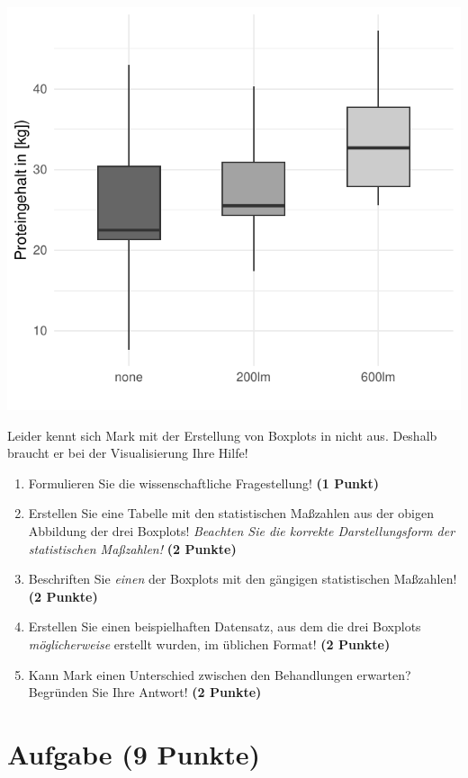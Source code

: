 \documentclass[a4paper, 9pt]{scrartcl}\usepackage[]{graphicx}\usepackage[]{xcolor}
\makeatletter
\def\maxwidth{ %
  \ifdim\Gin@nat@width>\linewidth
    \linewidth
  \else
    \Gin@nat@width
  \fi
}
\makeatother
\begin{document}
{\centering \includegraphics[width=\maxwidth]{img/boxplot-02-zer-1} 

}




Leider kennt sich Mark mit der Erstellung von Boxplots in \Rlogo nicht aus. Deshalb braucht er bei der Visualisierung Ihre Hilfe!

\begin{enumerate}
\item Formulieren Sie die wissenschaftliche Fragestellung! \textbf{(1 Punkt)}
\item Erstellen Sie eine Tabelle mit den statistischen Maßzahlen aus der obigen Abbildung der drei Boxplots! \textit{Beachten Sie die korrekte Darstellungsform der statistischen Maßzahlen!} \textbf{(2 Punkte)}
\item Beschriften Sie \textit{einen} der Boxplots mit den gängigen statistischen Maßzahlen! \textbf{(2 Punkte)}
\item Erstellen Sie einen beispielhaften Datensatz, aus dem die drei Boxplots \textit{möglicherweise} erstellt wurden, im \Rlogo üblichen Format! \textbf{(2 Punkte)}
\item Kann Mark einen Unterschied zwischen den Behandlungen erwarten? Begründen Sie Ihre Antwort! \textbf{(2 Punkte)}
\end{enumerate} 
\clearpage

\section{Aufgabe \hfill (9 Punkte)}
\end{document}
